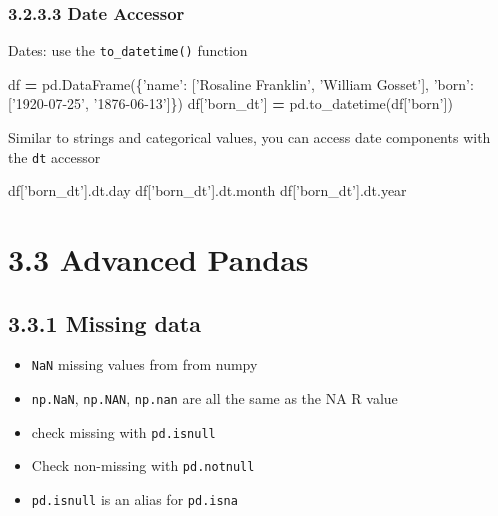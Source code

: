 \documentclass[]{book}
\newenvironment{Shaded}{\begin{snugshade}}{\end{snugshade}}
\newcommand{\NormalTok}[1]{#1}
\newcommand{\OperatorTok}[1]{\textcolor[rgb]{0.81,0.36,0.00}{\textbf{#1}}}
\newcommand{\StringTok}[1]{\textcolor[rgb]{0.31,0.60,0.02}{#1}}
\providecommand{\tightlist}{%
  \setlength{\itemsep}{0pt}\setlength{\parskip}{0pt}}
\theoremstyle{definition}
\theoremstyle{definition}
\theoremstyle{definition}
\theoremstyle{remark}
\begin{document}
\hypertarget{date-accessor}{%
\subsubsection{3.2.3.3 Date Accessor}\label{date-accessor}}

Dates: use the \texttt{to\_datetime()} function

\begin{Shaded}
\begin{Highlighting}[]
\NormalTok{df }\OperatorTok{=}\NormalTok{ pd.DataFrame(\{}\StringTok{'name'}\NormalTok{: [}\StringTok{'Rosaline Franklin'}\NormalTok{, }\StringTok{'William Gosset'}\NormalTok{], }
                   \StringTok{'born'}\NormalTok{: [}\StringTok{'1920-07-25'}\NormalTok{, }\StringTok{'1876-06-13'}\NormalTok{]\})}
\NormalTok{df[}\StringTok{'born_dt'}\NormalTok{] }\OperatorTok{=}\NormalTok{ pd.to_datetime(df[}\StringTok{'born'}\NormalTok{])}
\end{Highlighting}
\end{Shaded}

Similar to strings and categorical values, you can access date
components with the \texttt{dt} accessor

\begin{Shaded}
\begin{Highlighting}[]
\NormalTok{df[}\StringTok{'born_dt'}\NormalTok{].dt.day}
\NormalTok{df[}\StringTok{'born_dt'}\NormalTok{].dt.month}
\NormalTok{df[}\StringTok{'born_dt'}\NormalTok{].dt.year}
\end{Highlighting}
\end{Shaded}

\hypertarget{advanced-pandas}{%
\section{3.3 Advanced Pandas}\label{advanced-pandas}}

\hypertarget{missing-data}{%
\subsection{3.3.1 Missing data}\label{missing-data}}

\begin{itemize}
\tightlist
\item
  \texttt{NaN} missing values from from numpy
\item
  \texttt{np.NaN}, \texttt{np.NAN}, \texttt{np.nan} are all the same as
  the NA R value
\item
  check missing with \texttt{pd.isnull}
\item
  Check non-missing with \texttt{pd.notnull}
\item
  \texttt{pd.isnull} is an alias for \texttt{pd.isna}
\end{itemize}
\end{document}
